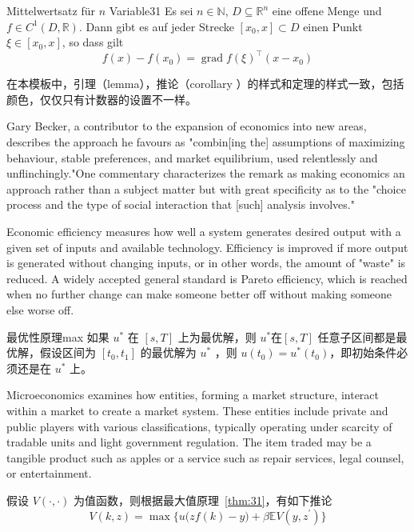 \documentclass{elegantbook}
\begin{document}
\begin{theorem}{Mittelwertsatz f\"{u}r $n$ Variable}{31}
Es sei $n\in\mathbb{N}$, $D\subseteq\mathbb{R}^n$ eine offene Menge und $f\in C^{1}(D,\mathbb{R})$. Dann gibt es auf jeder Strecke $[x_0,x]\subset D$ einen Punkt $\xi\in[x_0,x]$, so dass gilt
\begin{equation*}
   f(x)-f(x_0) = \operatorname{grad} f(\xi)^{\top}(x-x_0)
\end{equation*}
\end{theorem}

\begin{note}
在本模板中，引理（lemma），推论（corollary ）的样式和定理的样式一致，包括颜色，仅仅只有计数器的设置不一样。
\end{note}


Gary Becker, a contributor to the expansion of economics into new areas, describes the approach he favours as "combin[ing the] assumptions of maximizing behaviour, stable preferences, and market equilibrium, used relentlessly and unflinchingly."One commentary characterizes the remark as making economics an approach rather than a subject matter but with great specificity as to the "choice process and the type of social interaction that [such] analysis involves." 


Economic efficiency measures how well a system generates desired output with a given set of inputs and available technology. Efficiency is improved if more output is generated without changing inputs, or in other words, the amount of "waste" is reduced. A widely accepted general standard is Pareto efficiency, which is reached when no further change can make someone better off without making someone else worse off.

\begin{proposition}{最优性原理}{max}
如果 $u^*$ 在 $[s,T]$ 上为最优解，则 $u^*$在$[s,T]$ 任意子区间都是最优解，假设区间为 $[t_0,t_1]$ 的最优解为 $u^*$ ，则 $u(t_0)=u^{*}(t_0)$，即初始条件必须还是在 $u^*$ 上。
\end{proposition}

Microeconomics examines how entities, forming a market structure, interact within a market to create a market system. These entities include private and public players with various classifications, typically operating under scarcity of tradable units and light government regulation. The item traded may be a tangible product such as apples or a service such as repair services, legal counsel, or entertainment.

\begin{corollary}{}{}
假设 $V(\cdot,\cdot)$ 为值函数，则根据最大值原理~\ref{thm:31}，有如下推论
\[
V(k,z)=\max\Big\{u\big(zf(k)-y\big)+\beta \mathbb{E}V(y,z^\prime)\Big\}
\]
\end{corollary}
\end{document}
